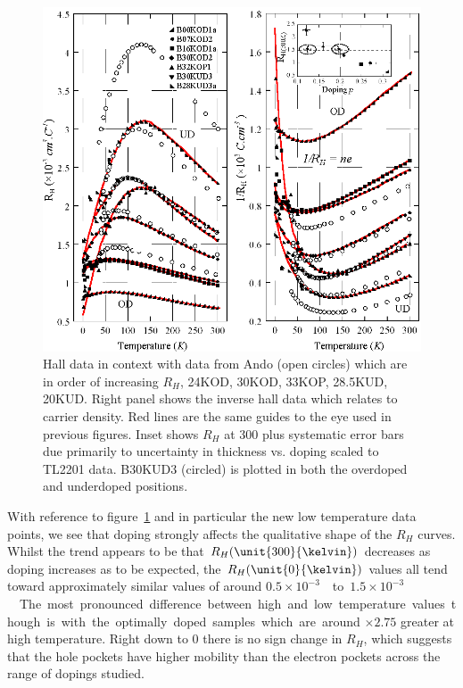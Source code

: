 \begin{figure}[htbp]
	\begin{center}
		\includegraphics[scale=1.1]{Chapter-HallBSCO/Figures/InvHallCombined/InvHallCombined}
		\caption{Hall data in context with data from Ando \etal\cite{Ando1999} (open circles) which are in order of increasing $R_H$, 24KOD, 30KOD, 33KOP, 28.5KUD, 20KUD. Right panel shows the inverse hall data which relates to carrier density. Red lines are the same guides to the eye used in previous figures. Inset shows $R_H$ at \unit{300}{\kelvin} plus systematic error bars due primarily to uncertainty in thickness vs. doping scaled to \ac{TL2201} data. B30KUD3 (circled) is plotted in both the overdoped and underdoped positions.}
		\label{Fig:ResH:InvHallCombined}
	\end{center}
\end{figure}

With reference to figure~\ref{Fig:ResH:InvHallCombined} and in particular the new low temperature data points, we see that doping strongly affects the qualitative shape of the $R_H$ curves. Whilst the trend appears to be that $R_H(\unit{300}{\kelvin})$ decreases as doping increases as to be expected, the $R_H(\unit{0}{\kelvin})$ values all tend toward approximately similar values of around \unit{$0.5\times 10^{-3}$}{\centi\metre\cubed}to \unit{$1.5\times 10^{-3}$}{\centi\metre\cubed}. The most pronounced difference between high and low temperature values though is with the optimally doped samples which are around $\times 2.75$ greater at high temperature. Right down to \unit{0}{\kelvin} there is no sign change in $R_H$, which suggests that the hole pockets have higher mobility than the electron pockets across the range of dopings studied.

